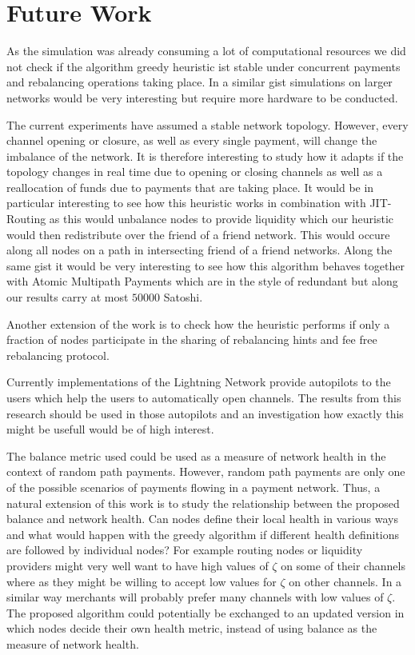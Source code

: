 \documentclass[a4paper]{paper}
\begin{document}
\section{Future Work}
\label{sec:future}

As the simulation was already consuming a lot of computational resources we did not check if the algorithm greedy heuristic ist stable under concurrent payments and rebalancing operations taking place.
In a similar gist simulations on larger networks would be very interesting but require more hardware to be conducted.

The current experiments have assumed a stable network topology. 
However, every channel opening or closure, as well as every single payment, will change the imbalance of the network.
It is therefore interesting to study how it adapts if the topology changes in real time due to opening or closing channels as well as a reallocation of funds due to payments that are taking place.
It would be in particular interesting to see how this heuristic works in combination with JIT-Routing as this would unbalance nodes to provide liquidity which our heuristic would then redistribute over the friend of a friend network.
This would occure along all nodes on a path in intersecting friend of a friend networks.
Along the same gist it would be very interesting to see how this algorithm behaves together with Atomic Multipath Payments which are in the style of \cite{bagaria2019boomerang} redundant but along our results carry at most $50000$ Satoshi. 

Another extension of the work is to check how the heuristic performs if only a fraction of nodes participate in the sharing of rebalancing hints and fee free rebalancing protocol.

Currently implementations of the Lightning Network provide autopilots to the users which help the users to automatically open channels.
The results from this research should be used in those autopilots and an investigation how exactly this might be usefull would be of high interest.

The balance metric used could be used as a measure of network health in the context of random path payments. 
However, random path payments are only one of the possible scenarios of payments flowing in a payment network. 
Thus, a natural extension of this work is to 
study the relationship between the proposed balance and network health. Can nodes define their local health in various ways and what would happen with the greedy algorithm if different health definitions are followed by individual nodes?
For example routing nodes or liquidity providers might very well want to have high values of $\zeta$ on some of their channels where as they might be willing to accept low values for $\zeta$ on other channels.
In a similar way merchants will probably prefer many channels with low values of $\zeta$.
The proposed algorithm could potentially be exchanged to an updated version in which nodes decide their own health metric,
instead of using balance as the measure of network health.
\end{document}
